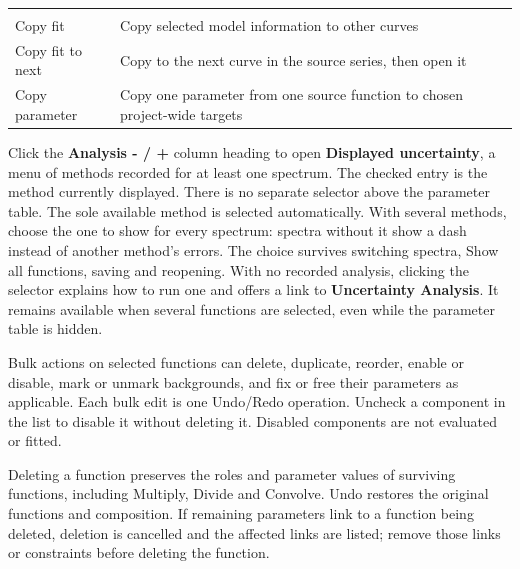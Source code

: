 \documentclass[
  10pt,
  a4paper,
  oneside]{scrreprt}
\begin{document}
\begin{longtable}[]{@{}ll@{}}
\begin{minipage}[t]{0.47\columnwidth}
\end{minipage}\tabularnewline
\begin{minipage}[t]{0.47\columnwidth}\raggedright
Copy fit\strut
\end{minipage} & \begin{minipage}[t]{0.47\columnwidth}\raggedright
Copy selected model information to other curves\strut
\end{minipage}\tabularnewline
\begin{minipage}[t]{0.47\columnwidth}\raggedright
Copy fit to next\strut
\end{minipage} & \begin{minipage}[t]{0.47\columnwidth}\raggedright
Copy to the next curve in the source series, then open it\strut
\end{minipage}\tabularnewline
\begin{minipage}[t]{0.47\columnwidth}\raggedright
Copy parameter\strut
\end{minipage} & \begin{minipage}[t]{0.47\columnwidth}\raggedright
Copy one parameter from one source function to chosen project-wide
targets\strut
\end{minipage}\tabularnewline
\bottomrule
\end{longtable}

Click the \textbf{Analysis - / +} column heading to open
\textbf{Displayed uncertainty}, a menu of methods recorded for at least
one spectrum. The checked entry is the method currently displayed. There
is no separate selector above the parameter table. The sole available
method is selected automatically. With several methods, choose the one
to show for every spectrum: spectra without it show a dash instead of
another method's errors. The choice survives switching spectra, Show all
functions, saving and reopening. With no recorded analysis, clicking the
selector explains how to run one and offers a link to
\textbf{Uncertainty Analysis}. It remains available when several
functions are selected, even while the parameter table is hidden.

Bulk actions on selected functions can delete, duplicate, reorder,
enable or disable, mark or unmark backgrounds, and fix or free their
parameters as applicable. Each bulk edit is one Undo/Redo operation.
Uncheck a component in the list to disable it without deleting it.
Disabled components are not evaluated or fitted.

Deleting a function preserves the roles and parameter values of
surviving functions, including Multiply, Divide and Convolve. Undo
restores the original functions and composition. If remaining parameters
link to a function being deleted, deletion is cancelled and the affected
links are listed; remove those links or constraints before deleting the
function.
\end{document}
